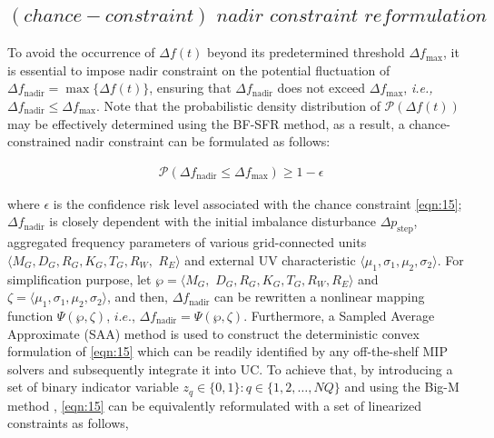 \documentclass[lettersize,journal]{IEEEtran}
\begin{document}
\vspace{-0.2in}
\subsection{$(chance-constraint)\,\, nadir \,\,constraint\,\, reformulation$}
To avoid the occurrence of $\varDelta f(t)$ beyond its predetermined threshold $\varDelta f_{\max}$, it is essential to impose nadir constraint on the potential fluctuation of $\varDelta f_{\text{nadir}} = \max\{\varDelta f(t)\}$, ensuring that $\varDelta f_{\text{nadir}}$ does not exceed $\varDelta f_{\text{max}}$, \textit{i.e.,} $\varDelta f_{\text{nadir}}\leq \varDelta f_{\text{max}}$. Note that the probabilistic density distribution of $\mathcal{P}(\varDelta f(t))$ may be effectively determined using the BF-SFR method, as a result, a chance-constrained nadir constraint can be formulated as follows:

\vspace{-0.125in}
\begin{small}
	\begin{align}\label{eqn:15}
		 & \mathcal{P}\left(\varDelta f_{\text{nadir}} \leq \varDelta f_{\text{max}}\right) \geq 1-\epsilon
	\end{align}
\end{small}

\noindent where $\epsilon$ is the confidence risk level associated with the chance constraint \eqref{eqn:15}; $\varDelta f_{\text{nadir} }$ is closely dependent with the initial imbalance disturbance $\varDelta p_{\text{step}}$, aggregated frequency parameters of various grid-connected units $\langle M_{G},\! D_{G}, \!R_{G}, \!K_{G}, \!T_{G}, R_{W},$ $R_{E}\rangle $ and external UV characteristic $\langle \mu_{1}, \sigma_{1}, \mu_{2}, \sigma_{2}\rangle $. For simplification purpose, let ${\wp}=\langle M_{G},$ $\! D_{G}, \!R_{G}, \!K_{G}, \!T_{G}, R_{W},\!R_{E}\rangle $ and ${\zeta} = \langle \mu_{1}, \sigma_{1}, \mu_{2}, \sigma_{2}\rangle $, and then, $\varDelta f_{\text{nadir}}$ can be  rewritten a nonlinear mapping function $\Psi(\wp, \zeta)$, $i.e.$, $\varDelta f_{\text{nadir}} = \Psi(\wp, \zeta)$. Furthermore, a Sampled Average Approximate (SAA) method is used to construct the deterministic convex formulation of \eqref{eqn:15} which can be readily identified by any off-the-shelf MIP solvers and subsequently integrate it into UC. To achieve that, by introducing a set of binary indicator variable $z_{q}\in\{0,1\} \!:\!q\!\in\!\{1, 2,\ldots, N\!Q\}$ and using the Big-M method \cite{ding2021two,zhang2020modeling},  \cref{eqn:15} can be equivalently reformulated with a set of linearized constraints as follows,
\end{document}
